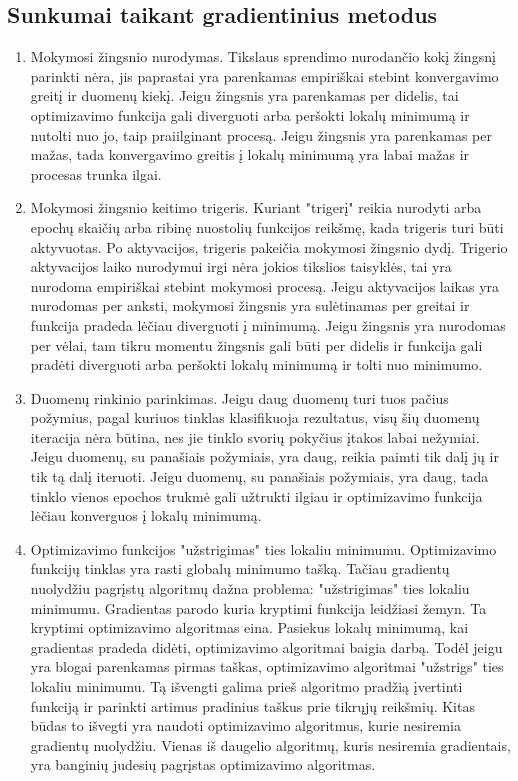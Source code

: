 \documentclass{VUMIFInfKursinis}
\begin{document}
\subsection{Sunkumai taikant gradientinius metodus}
\begin{enumerate}
\item Mokymosi žingsnio nurodymas. Tikslaus sprendimo nurodančio kokį žingsnį parinkti nėra, jis paprastai
yra parenkamas empiriškai stebint konvergavimo greitį ir duomenų kiekį. Jeigu žingsnis yra parenkamas per didelis,
tai optimizavimo funkcija gali diverguoti arba peršokti lokalų minimumą ir nutolti nuo jo, taip praiilginant
procesą. Jeigu žingsnis yra parenkamas per mažas, tada konvergavimo greitis į lokalų minimumą yra labai mažas
ir procesas trunka ilgai. \cite{salt17}
\item Mokymosi žingsnio keitimo trigeris. Kuriant "trigerį" reikia nurodyti arba epochų skaičių arba ribinę nuostolių
funkcijos reikšmę, kada trigeris turi būti aktyvuotas. Po aktyvacijos, trigeris pakeičia mokymosi žingsnio dydį.
Trigerio aktyvacijos laiko nurodymui irgi nėra jokios tikslios taisyklės, tai yra nurodoma empiriškai stebint
mokymosi procesą. Jeigu aktyvacijos laikas yra nurodomas per anksti, mokymosi žingsnis yra sulėtinamas per greitai
ir funkcija pradeda lėčiau diverguoti į minimumą. Jeigu žingsnis yra nurodomas per vėlai, tam tikru momentu
žingsnis gali būti per didelis ir funkcija gali pradėti diverguoti arba peršokti lokalų minimumą ir tolti nuo
minimumo. \cite{salt17}
\item Duomenų rinkinio parinkimas. Jeigu daug duomenų turi tuos pačius požymius, pagal kuriuos tinklas klasifikuoja
rezultatus, visų šių duomenų iteracija nėra būtina, nes jie tinklo svorių pokyčius įtakos labai nežymiai.
Jeigu duomenų, su panašiais požymiais, yra daug, reikia paimti tik dalį jų ir tik tą dalį iteruoti. Jeigu
duomenų, su panašiais požymiais, yra daug, tada tinklo vienos epochos trukmė gali užtrukti ilgiau ir optimizavimo
funkcija lėčiau konverguos į lokalų minimumą. \cite{salt17}
\item Optimizavimo funkcijos "užstrigimas" ties lokaliu minimumu. Optimizavimo funkcijų tinklas yra rasti
globalų minimumo tašką. Tačiau gradientų nuolydžiu pagrįstų algoritmų dažna problema: "užstrigimas" ties
lokaliu minimumu. Gradientas parodo kuria kryptimi funkcija leidžiasi žemyn. Ta kryptimi optimizavimo algoritmas
eina. Pasiekus lokalų minimumą, kai gradientas pradeda didėti, optimizavimo algoritmai baigia darbą. Todėl jeigu yra
blogai parenkamas pirmas taškas, optimizavimo algoritmai "užstrigs" ties lokaliu minimumu. \cite{salt17} Tą išvengti galima prieš algoritmo pradžią
įvertinti funkciją ir parinkti artimus pradinius taškus prie tikrųjų reikšmių. Kitas būdas to išvegti yra naudoti
optimizavimo algoritmus, kurie nesiremia gradientų nuolydžiu. Vienas iš daugelio algoritmų, kuris nesiremia gradientais, yra
banginių judesių pagrįstas optimizavimo algoritmas.
\end{enumerate}
\end{document}
